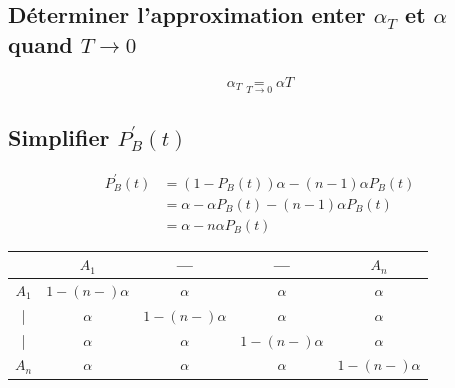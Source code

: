 \documentclass[11pt,a4paper]{article}
\begin{document}
	\subsection{Déterminer l'approximation enter $\alpha_{T}$ et $\alpha$ quand $T \to 0$}
	$$\alpha_{T} \underset{T \to 0}{=} \alpha T$$
	
	\subsection{Simplifier $P_{B}^{\prime}(t)$}
	\begin{align*}
		P_{B}^{\prime}(t) &= (1 - P_{B}(t))\alpha - (n - 1)\alpha P_{B}(t)\\
		&= \alpha - \alpha P_{B}(t) - (n - 1)\alpha P_{B}(t)\\
		&= \alpha - n\alpha P_{B}(t)
	\end{align*}
	
	\begin{center}
		\begin{tabular}{|c|c|c|c|c|}
			\hline 
			& $A_{1}$ & --- & --- & $A_{n}$ \\ 
			\hline 
			$A_{1}$ & $1 - (n - )\alpha$ & $\alpha$ & $\alpha$ & $\alpha$ \\ 
			\hline 
			| & $\alpha$ & $1 - (n - )\alpha$ & $\alpha$ & $\alpha$ \\ 
			\hline 
			| & $\alpha$ & $\alpha$ & $1 - (n - )\alpha$ & $\alpha$ \\ 
			\hline 
			$A_{n}$ & $\alpha$ & $\alpha$ & $\alpha$ & $1 - (n - )\alpha$ \\ 
			\hline 
		\end{tabular} 
	\end{center}
\end{document}
